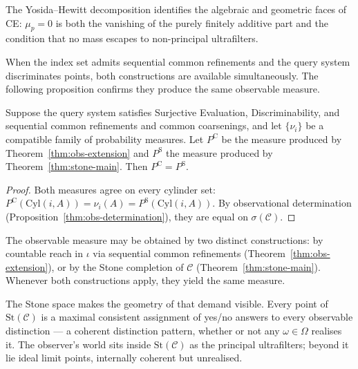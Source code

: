 The Yosida--Hewitt decomposition identifies the algebraic and geometric faces of CE: $\mu_p = 0$ is both the vanishing of the purely finitely additive part and the condition that no mass escapes to non-principal ultrafilters.

When the index set admits sequential common refinements and the query system discriminates points, both constructions are available simultaneously. The following proposition confirms they produce the same observable measure.

\begin{proposition}
\label{prop:coincidence}
Suppose the query system satisfies Surjective Evaluation, Discriminability, and sequential common refinements and common coarsenings, and let $\{\nu_i\}$ be a compatible family of probability measures.  Let $P^{\mathrm{C}}$ be the measure produced by Theorem~\ref{thm:obs-extension} and $P^{\mathrm{S}}$ the measure produced by Theorem~\ref{thm:stone-main}.  Then $P^{\mathrm{C}} = P^{\mathrm{S}}$.
\end{proposition}

\begin{proof}
Both measures agree on every cylinder set: $P^{\mathrm{C}}(\mathrm{Cyl}(i, A)) = \nu_i(A) = P^{\mathrm{S}}(\mathrm{Cyl}(i, A))$.  By observational determination (Proposition~\ref{thm:obs-determination}), they are equal on $\sigma(\mathcal{C})$.
\end{proof}

\begin{corollary}
The observable measure may be obtained by two distinct constructions: by countable reach in $\iota$ via sequential common refinements (Theorem~\ref{thm:obs-extension}), or by the Stone completion of $\mathcal{C}$ (Theorem~\ref{thm:stone-main}). Whenever both constructions apply, they yield the same measure.
\end{corollary}

\noindent The Stone space makes the geometry of that demand visible.  Every point of $\mathrm{St}(\mathcal{C})$ is a maximal consistent assignment of yes/no answers to every observable distinction --- a coherent distinction pattern, whether or not any $\omega \in \Omega$ realises it.  The observer's world sits inside $\mathrm{St}(\mathcal{C})$ as the principal ultrafilters; beyond it lie ideal limit points, internally coherent but unrealised.




